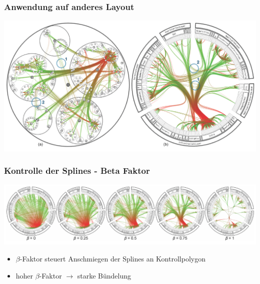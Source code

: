 \documentclass[11pt]{beamer}
\begin{document}
\begin{frame}
\frametitle{Anwendung auf anderes Layout}
\includegraphics[scale=0.35]{./Algorithm_Result_OtherLayout.png}
\end{frame}

\begin{frame}
\frametitle{Kontrolle der Splines - Beta Faktor}
\includegraphics[scale=0.35]{./Algorithm_BetaFactor_Results.png}
\begin{itemize}
\bigskip
\item $\beta$-Faktor steuert Anschmiegen der Splines an Kontrollpolygon
\item hoher $\beta$-Faktor $\rightarrow$ starke Bündelung
\end{itemize}
\end{frame}
\end{document}

